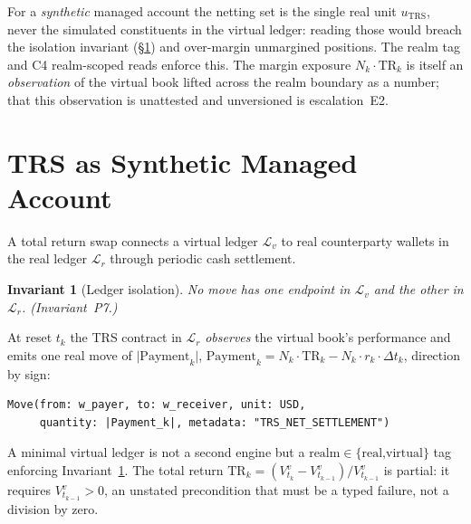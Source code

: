 \documentclass[11pt,a4paper]{article}
\newtheorem{invariant}[definition]{Invariant}
\begin{document}
\noindent For a \emph{synthetic} managed account the netting set is the single real unit
$u_{\mathrm{TRS}}$, never the simulated constituents in the virtual ledger: reading those would
breach the isolation invariant (\S\ref{sec:trs}) and over-margin unmargined positions. The realm
tag and C4 realm-scoped reads enforce this. The margin exposure $N_k\cdot\mathrm{TR}_k$ is itself
an \emph{observation} of the virtual book lifted across the realm boundary as a number; that this
observation is unattested and unversioned is escalation~E2.

\section{TRS as Synthetic Managed Account}
\label{sec:trs}

A total return swap connects a virtual ledger $\mathcal{L}_v$ to real counterparty wallets in the
real ledger $\mathcal{L}_r$ through periodic cash settlement.

\begin{invariant}[Ledger isolation]
\label{inv:p7}
No move has one endpoint in $\mathcal{L}_v$ and the other in $\mathcal{L}_r$. (Invariant~P7.)
\end{invariant}

\noindent At reset $t_k$ the TRS contract in $\mathcal{L}_r$ \emph{observes} the virtual book's
performance and emits one real move of $\big|\mathrm{Payment}_k\big|$,
$\mathrm{Payment}_k=N_k\cdot\mathrm{TR}_k-N_k\cdot r_k\cdot\Delta t_k$, direction by sign:
\begin{lstlisting}
Move(from: w_payer, to: w_receiver, unit: USD,
     quantity: |Payment_k|, metadata: "TRS_NET_SETTLEMENT")
\end{lstlisting}
A minimal virtual ledger is not a second engine but a $\mathrm{realm}\in\{\text{real,virtual}\}$
tag enforcing Invariant~\ref{inv:p7}. The total return $\mathrm{TR}_k=(V^v_{t_k}-V^v_{t_{k-1}})/
V^v_{t_{k-1}}$ is partial: it requires $V^v_{t_{k-1}}>0$, an unstated precondition that must be a
typed failure, not a division by zero.
\end{document}
